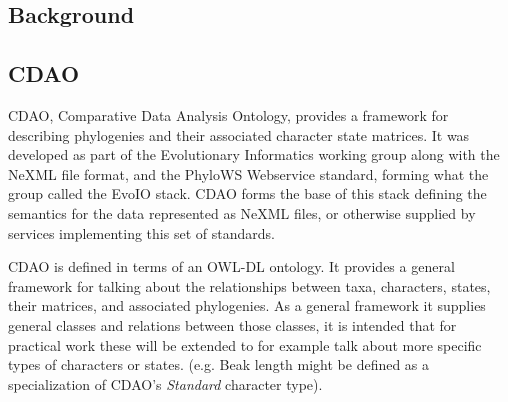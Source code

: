 \documentclass[10pt]{bmc_article}
\newenvironment{bmcformat}{\begin{raggedright}\baselineskip20pt\sloppy\setboolean{publ}{false}}{\end{raggedright}\baselineskip20pt\sloppy}
\begin{document}
\begin{bmcformat}




\section*{Background}
\subsection*{CDAO}

  CDAO, Comparative Data Analysis Ontology, provides a framework for describing phylogenies and their associated
  character state matrices. It was developed as part of the Evolutionary Informatics working group along with the
  NeXML file format, and the PhyloWS Webservice standard, forming what the group called the EvoIO stack. CDAO forms
  the base of this stack defining the semantics for the data represented as NeXML files, or otherwise supplied by
  services implementing this set of standards. 

  CDAO is defined in terms of an OWL-DL ontology. It provides a general framework
  for talking about the relationships between taxa, characters, states, their matrices, and associated 
  phylogenies. As a general framework it supplies general classes and relations between those classes, 
  it is intended that for practical work these will be extended to for example talk about more specific
  types of characters or states. (e.g. Beak length might be defined as a specialization of CDAO's \textit{Standard} 
  character type). 


\end{bmcformat}
\end{document}
